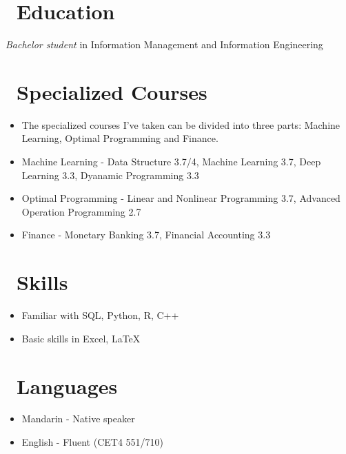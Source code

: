 \documentclass{resume}
\begin{document}



\section{\faGraduationCap\ Education}
\textit{Bachelor student} in Information Management and Information Engineering

\section{\faUsers\ Specialized Courses}
\begin{itemize}[parsep=0.5ex]
  \item The specialized courses I've taken can be divided into three parts: Machine Learning, Optimal Programming and Finance.
  \item Machine Learning - Data Structure 3.7/4, Machine Learning 3.7, Deep Learning 3.3, Dyanamic Programming 3.3
  \item Optimal Programming - Linear and Nonlinear Programming 3.7, Advanced Operation Programming 2.7
  \item Finance - Monetary Banking 3.7, Financial Accounting 3.3
\end{itemize}
  
\section{\faCogs\ Skills}
\begin{itemize}[parsep=0.5ex]
  \item Familiar with SQL, Python, R, C++
  \item Basic skills in Excel, LaTeX
\end{itemize}

\section{\faInfo\ Languages}
\begin{itemize}[parsep=0.5ex]
  \item Mandarin - Native speaker
  \item English - Fluent (CET4 551/710)
\end{itemize}

%
%
\end{document}
